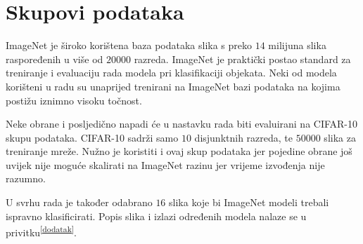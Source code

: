 \documentclass[utf8, diplomski]{fer}
\begin{document}
\section{Skupovi podataka}
ImageNet\citep{ILSVRC15} je široko korištena baza podataka slika s preko $14$ milijuna slika raspoređenih u više od $20000$ razreda. ImageNet je praktički postao standard za treniranje i evaluaciju rada modela pri klasifikaciji objekata. Neki od modela korišteni u radu su unaprijed trenirani na ImageNet bazi podataka na kojima postižu iznimno visoku točnost.
\par
Neke obrane i posljedično napadi će u nastavku rada biti evaluirani na CIFAR-10\citep{cifar10} skupu podataka. CIFAR-10 sadrži samo $10$ disjunktnih razreda, te $50000$ slika za treniranje mreže. Nužno je koristiti i ovaj skup podataka jer pojedine obrane još uvijek nije moguće skalirati na ImageNet razinu jer vrijeme izvođenja nije razumno.
\par
U svrhu rada je također odabrano $16$ slika koje bi ImageNet modeli trebali ispravno klasificirati. Popis slika i izlazi određenih modela nalaze se u privitku\textsuperscript{\ref{dodatak}}.
\end{document}
